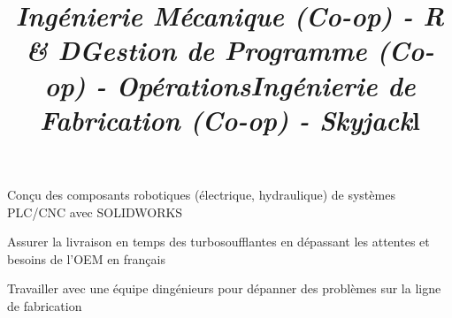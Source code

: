 \documentclass[mm]{res}
\begin{document}
\begin{resume}
\title{\textsl{Ing\'enierie M\'ecanique (Co-op) - R \& D}}
\begin{position}
\tb Con\c{c}u des composants robotiques (\'electrique, hydraulique) de syst\`emes PLC/CNC avec SOLIDWORKS
\end{position}

\title{\textsl{Gestion de Programme (Co-op) - Op\'erations}}
\begin{position}
\tb Assurer la livraison en temps des turbosoufflantes en d\'epassant les attentes et besoins de l'OEM en fran\c{c}ais
\end{position}

\title{\textsl{Ing\'enierie de Fabrication (Co-op) - Skyjack}}
\begin{position}
\tb Travailler avec une \'equipe d\textquotesingle ing\'enieurs pour d\'epanner des probl\`emes sur la ligne de fabrication
\end{position}


\toprule

\section{\headingprojects}
\begin{format}
\title{l}\\
\body\\
\end{format}



\end{resume}
\end{document}

